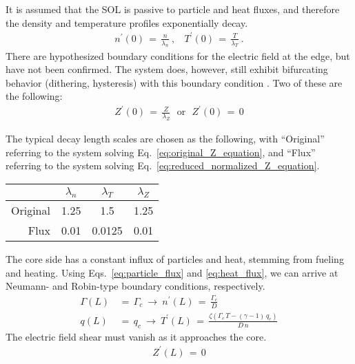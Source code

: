 It is assumed that the SOL is passive to particle and heat fluxes, and therefore the density and temperature profiles exponentially decay.
\begin{align} %
	n^\prime(0) \,=\, \frac{n}{\lambda_n}~, ~~~~
		T^\prime(0) \,=\, \frac{T}{\lambda_T}~. \label{eq:SOL_boundary}
\end{align}
There are hypothesized boundary conditions for the electric field at the edge, but have not been confirmed.
The system does, however, still exhibit bifurcating behavior (dithering, hysteresis) with this boundary condition \cite{paquay_studying_2012}.
Two of these are the following:
\begin{align} %
	Z^\prime(0) \,=\, \frac{Z}{\lambda_Z} ~~~ \text{or} ~~~ Z^\prime(0) \,=\,
		0 \label{eq:Z_edge_conds}
\end{align}

The typical decay length scales are chosen as the following, with ``Original'' referring to the system solving Eq.~\ref{eq:original_Z_equation}, and ``Flux'' referring to the system solving Eq.~\ref{eq:reduced_normalized_Z_equation}.
\begin{table}[h] %
\centering
\begin{tabular}{r|ccc}
	& $\lambda_n$ & $\lambda_T$ & $\lambda_Z$ \\ \hline
	Original & 1.25 & 1.5 & 1.25 \\ \hline
	Flux & 0.01 & 0.0125 & 0.01
\end{tabular}
\end{table}

The core side has a constant influx of particles and heat, stemming from fueling and heating.
Using Eqs.~\ref{eq:particle_flux} and \ref{eq:heat_flux}, we can arrive at Neumann- and Robin-type boundary conditions, respectively.
\begin{align} %
	\Gamma(L) \,&=\, \Gamma_c ~\longrightarrow~ n^\prime(L)
		\,=\, \frac{\Gamma_c}{D} \label{eq:core_particle_flux}\\
	q(L) \,&=\, q_c ~\longrightarrow~ T^\prime(L) \,=\, \frac{\zeta(
		\Gamma_c \, T - (\gamma - 1)\,q_c)}{D \, n} \label{eq:core_heat_flux}
\end{align}
The electric field shear must vanish as it approaches the core.
\begin{align} %
	Z^\prime(L) \,=\, 0 \label{eq:core_Z_boundary}
\end{align}

